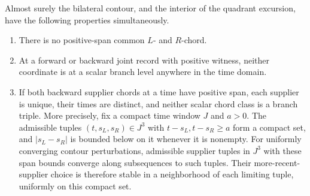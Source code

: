 \begin{lemma}\label{enc:chord-genericity}
Almost surely the bilateral contour, and the interior of the quadrant
excursion, have the following properties simultaneously.
\begin{enumerate}[label=\textup{(\roman*)}]
\item There is no positive-span common $L$- and $R$-chord.
\item At a forward or backward joint record with positive witness,
neither coordinate is at a scalar branch level anywhere in the time
domain.
\item If both backward supplier chords at a time have positive span,
each supplier is unique, their times are distinct, and neither scalar
chord class is a branch triple.  More precisely, fix a compact time
window $J$ and $a>0$.  The admissible tuples
$(t,s_L,s_R)\in J^3$ with $t-s_L,t-s_R\ge a$ form a compact set,
and $|s_L-s_R|$ is bounded below on it whenever it is nonempty.
For uniformly converging contour perturbations, admissible supplier
tuples in $J^3$ with these span bounds converge along subsequences to
such tuples.  Their more-recent-supplier choice is therefore stable
in a neighborhood of each limiting tuple, uniformly on this compact set.
\end{enumerate}
\end{lemma}

